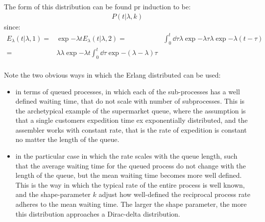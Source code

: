 \documentclass{article}
\begin{document}
The form of this distribution can be found pr induction to be:
\begin{align*}
    P(t \vert \lambda, k) 
\end{align*}
since:
\begin{align*}
	E_{\lambda}(t \vert \lambda, 1) =& \exp{- \lambda t}
	E_{\lambda}(t \vert \lambda, 2)
	=& \int_{0}^{t} \dd \tau \lambda \exp{ - \lambda \tau} \lambda \exp{- \lambda(t-\tau)} \\
	=& \lambda \lambda \exp{- \lambda t} \int_{0}^{t} \dd \tau \exp{- (\lambda - \lambda)\tau} \\
\end{align*}

Note the two obvious ways in which the Erlang distributed can be used:
\begin{itemize}
    \item in terms of queued processes, in which each of the sub-processes has a well defined waiting time, that do not scale with number of subprocesses. 
        This is the archetypical example of the supermarket queue, where the assumption is that a single customers expedition time ex exponentially distributed, and the assembler works with constant rate, that is the rate of expedition is constant no matter the length of the queue. 
    \item in the particular case in which the rate scales with the queue length, such that the average waiting time for the queued process do not change with the length of the queue, but the mean waiting time becomes more well defined. 
        This is the way in which the typical rate of the entire process is well known, and the shape-parameter $k$ adjust how well-defined the reciprocal process rate adheres to the mean waiting time. 
        The larger the shape parameter, the more this distribution approaches a Dirac-delta distribution.
\end{itemize}




\appendix

\newpage
% 
% 

% 

% 
\end{document}
